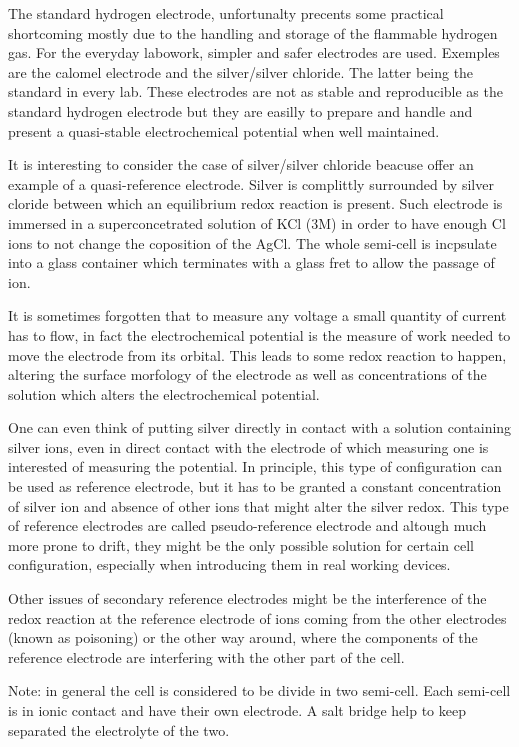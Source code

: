 The standard hydrogen electrode, unfortunalty precents some practical shortcoming mostly due to the handling and storage of the flammable hydrogen gas. For the everyday labowork, simpler and safer electrodes are used. Exemples are the calomel electrode and the silver/silver chloride. The latter being the standard in every lab. These electrodes are not as stable and reproducible as the standard hydrogen electrode but they are easilly to prepare and handle and present a quasi-stable electrochemical potential when well maintained. 

It is interesting to consider the case of silver/silver chloride beacuse offer an example of a quasi-reference electrode. Silver is complittly surrounded by silver cloride between which an equilibrium redox reaction is present. Such electrode is immersed in a superconcetrated solution of KCl (3M) in order to have enough Cl ions to not change the coposition of the AgCl. The whole semi-cell is incpsulate into a glass container which terminates with a glass fret to allow the passage of ion.

It is sometimes forgotten that to measure any voltage a small quantity of current has to flow, in fact the electrochemical potential is the measure of work needed to move the electrode from its orbital. This leads to some redox reaction to happen, altering the surface morfology of the electrode as well as concentrations of the solution which alters the electrochemical potential.

One can even think of putting silver directly in contact with a solution containing silver ions, even in direct contact with the electrode of which measuring one is interested of measuring the potential. In principle, this type of configuration can be used as reference electrode, but it has to be granted a constant concentration of silver ion and absence of other ions that might alter the silver redox. This type of reference electrodes are called pseudo-reference electrode and altough much more prone to drift, they might be the only possible solution for certain cell configuration, especially when introducing them in real working devices.

Other issues of secondary reference electrodes might be the interference of the redox reaction at the reference electrode of ions coming from the other electrodes (known as poisoning) or the other way around, where the components of the reference electrode are interfering with the other part of the cell. 

Note: in general the cell is considered to be divide in two semi-cell. Each semi-cell is in ionic contact and have their own electrode. A salt bridge help to keep separated the electrolyte of the two.

